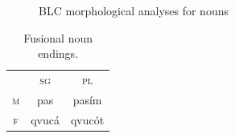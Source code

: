 \begin{description}
\begin{figure}[t]
\begin{mdframed}
\begin{tabbing}
\end{tabbing}
\caption{BLC morphological analyses for nouns}
\end{mdframed}
\end{figure}
   
   \begin{table}[t]
      \small
      \centering
       \setlength{\extrarowheight}{6pt}
      \begin{tabular}{ccc} 
 \toprule
 &  \textsc{sg} & \textsc{pl}\\
\cmidrule{2-3} 
\textsc{m} & pas & pas\'{i}m \\
\textsc{f}  &	qvuc\'{a}	& qvuc\'ot \\	
    \bottomrule
    \end{tabular}
    \label{tab:abs-only}
    \caption{Fusional noun endings.}
    \end{table}
    

\end{description}
